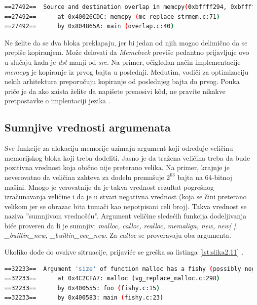 \documentclass[12pt,oneside]{memoir}
\theoremstyle{plain}
\theoremstyle{definition}
\begin{document}
\begin{lstlisting}[style=terminal,caption={Primer ispisa greške preklapanja izvornog i odredišnog bloka, izvor: \cite{Memcheck}}, label={lst:slika2.10},language={bash}] 
==27492==  Source and destination overlap in memcpy(0xbffff294, 0xbffff280, 21)
==27492==      at 0x40026CDC: memcpy (mc_replace_strmem.c:71)
==27492==      by 0x804865A: main (overlap.c:40)
\end{lstlisting}

Ne želite da se dva bloka preklapaju, jer bi jedan od njih mogao delimično da se prepiše kopiranjem. Može delovati da \textit{Memcheck} previše pedantno prijavljuje ovo u slučaju kada je \textit{dst} manji od \textit{src}. Na primer, očigledan način implementacije \textit{memcpy}  je kopiranje iz prvog bajta u poslednji. Međutim, vodiči za optimizaciju nekih arhitektura preporučuju kopiranje od poslednjeg bajta do prvog. Pouka priče je da ako zaista želite da napišete prenosivi k\^od, ne pravite nikakve pretpostavke o implentaciji jezika \cite{Memcheck}. 

\subsection{Sumnjive vrednosti argumenata}
Sve funkcije za alokaciju memorije uzimaju argument koji određuje veličinu memorijskog bloka koji treba dodeliti. Jasno je da tražena veličina treba da bude pozitivna vrednost koja obično nije preterano velika. Na primer, krajnje je neverovatno da veličina zahteva za dodelu premašuje ${2}^{63}$ bajta na 64-bitnoj mašini. Mnogo je verovatnije da je takva vrednost rezultat pogrešnog izračunavanja veličine i da je u stvari negativna vrednost (koja se čini preterano velikom jer se obrazac bita tumači kao nepotpisani celi broj). Takva vrednost se naziva ''sumnjivom vrednošću''. Argument veličine sledećih funkcija dodeljivanja biće proveren da li je sumnjiv: \textit{malloc, calloc, realloc, memalign, new, new[ ]. \_builtin\_new, \_builtin\_vec\_new}. Za \textit{calloc} se proveravaju oba argumenta.

Ukoliko dođe do ovakve sitruacije, prijaviće se greška sa listinga \ref{lst:slika2.11} \cite{Memcheck}. 

\begin{lstlisting}[style=terminal,caption={Primer ispisa greške sumnjive vrednosti argumenata, izvor: \cite{Memcheck}}, label={lst:slika2.11},language={bash}] 
==32233==  Argument 'size' of function malloc has a fishy (possibly negative) value: -3
==32233==      at 0x4C2CFA7: malloc (vg_replace_malloc.c:298)
==32233==      by 0x400555: foo (fishy.c:15)
==32233==      by 0x400583: main (fishy.c:23)
\end{lstlisting}
\end{document}

